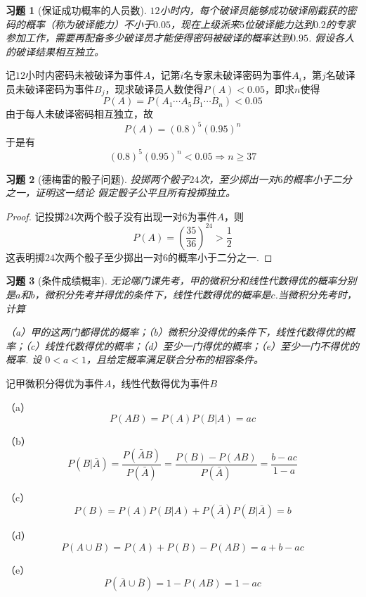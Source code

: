 \documentclass[12pt,fontset=fandol]{ctexart}
\newtheorem{exercise}{习题}[section]
\begin{document}
\begin{exercise}[保证成功概率的人员数]\label{q:Y2.9}
$12$小时内，每个破译员能够成功破译刚截获的密码的概率（称为破译能力）不小于$0.05$，现在上级派来$5$位破译能力达到$0.2$的专家参加工作，需要再配备多少破译员才能使得密码被破译的概率达到$0.95$. 假设各人的破译结果相互独立。\par{}
\end{exercise}

\begin{solve}\label{a:Y2.9}
记$12$小时内密码未被破译为事件$A$，记第$i$名专家未破译密码为事件$A_i$，第$j$名破译员未破译密码为事件$B_j$，现求破译员人数使得$P(A)<0.05$，即求$n$使得
\[P(A) = P({A_1} \cdots {A_5}{B_1} \cdots {B_n}) < 0.05\]
由于每人未破译密码相互独立，故
\[P(A) = {(0.8)^5}{(0.95)^n}\]
于是有
\[{(0.8)^5}{(0.95)^n} < 0.05 \Rightarrow n \geqslant 37\]
\end{solve}

\begin{exercise}[德梅雷的骰子问题]\label{q:Y2.10}
投掷两个骰子$24$次，至少掷出一对$6$的概率小于二分之一，证明这一结论 假定骰子公平且所有投掷独立。\par{}
\end{exercise}

\begin{proof}\label{a:Y2.10}
记投掷$24$次两个骰子没有出现一对$6$为事件$A$，则
\[P(A) = {\left( {\frac{{35}}{{36}}} \right)^{24}} > \frac{1}{2}\]
这表明掷$24$次两个骰子至少掷出一对$6$的概率小于二分之一.
\end{proof}

\begin{exercise}[条件成绩概率]\label{q:Y2.11}
无论哪门课先考，甲的微积分和线性代数得优的概率分别是$a$和$b$，微积分先考并得优的条件下，线性代数得优的概率是$c$.当微积分先考时，计算

（a）甲的这两门都得优的概率；（b）微积分没得优的条件下，线性代数得优的概率；（c）线性代数得优的概率；（d）至少一门得优的概率；（e）至少一门不得优的概率. 设 $0<a<1$，且给定概率满足联合分布的相容条件。\par{}
\end{exercise}

\begin{solve}\label{a:Y2.11}
记甲微积分得优为事件$A$，线性代数得优为事件$B$

（a）
\[P(AB) = P(A)P(B|A) = ac\]

（b）\[P(B|\bar A) = \frac{{P(\bar AB)}}{{P(\bar A)}} = \frac{{P(B) - P(AB)}}{{P(\bar A)}} = \frac{{b - ac}}{{1 - a}}\]

（c）
\[P(B) = P(A)P(B|A) + P(\bar A)P(B|\bar A) = b\]

（d）
\[P(A \cup B) = P(A) + P(B) - P(AB) = a + b - ac\]

（e）
\[P(\overline A  \cup \overline B ) = 1 - P(AB) = 1 - ac\]
\end{solve}
\end{document}
